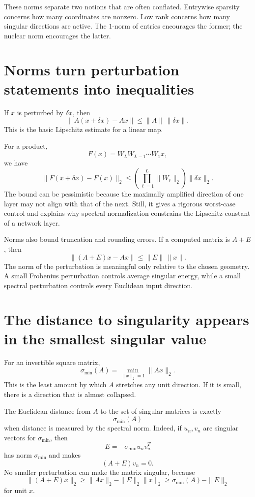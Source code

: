 These norms separate two notions that are often conflated.  Entrywise sparsity concerns how many coordinates are nonzero.  Low rank concerns how many singular directions are active.  The \(1\)-norm of entries encourages the former; the nuclear norm encourages the latter.

\section{Norms turn perturbation statements into inequalities}

If \(x\) is perturbed by \(\delta x\), then
\[
  \|A(x+\delta x)-Ax\|
  \le \|A\|\,\|\delta x\|.
\]
This is the basic Lipschitz estimate for a linear map.

For a product,
\[
  F(x)=W_LW_{L-1}\cdots W_1x,
\]
we have
\[
  \|F(x+\delta x)-F(x)\|_2
  \le
  \left(\prod_{\ell=1}^L\|W_\ell\|_2\right)
  \|\delta x\|_2.
\]
The bound can be pessimistic because the maximally amplified direction of one layer may not align with that of the next.  Still, it gives a rigorous worst-case control and explains why spectral normalization constrains the Lipschitz constant of a network layer.

Norms also bound truncation and rounding errors.  If a computed matrix is \(A+E\), then
\[
  \|(A+E)x-Ax\|
  \le \|E\|\,\|x\|.
\]
The norm of the perturbation is meaningful only relative to the chosen geometry.  A small Frobenius perturbation controls average singular energy, while a small spectral perturbation controls every Euclidean input direction.

\section{The distance to singularity appears in the smallest singular value}

For an invertible square matrix,
\[
  \sigma_{\min}(A)
  =\min_{\|x\|_2=1}\|Ax\|_2.
\]
This is the least amount by which \(A\) stretches any unit direction.  If it is small, there is a direction that is almost collapsed.

The Euclidean distance from \(A\) to the set of singular matrices is exactly
\[
  \sigma_{\min}(A)
\]
when distance is measured by the spectral norm.  Indeed, if \(u_n,v_n\) are singular vectors for \(\sigma_{\min}\), then
\[
  E=-\sigma_{\min}u_nv_n^T
\]
has norm \(\sigma_{\min}\) and makes
\[
  (A+E)v_n=0.
\]
No smaller perturbation can make the matrix singular, because
\[
  \|(A+E)x\|_2
  \ge \|Ax\|_2-\|E\|_2\|x\|_2
  \ge \sigma_{\min}(A)-\|E\|_2
\]
for unit \(x\).

